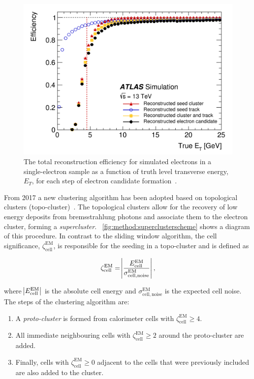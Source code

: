 \begin{figure}[]
    \centering
    \includegraphics[width=\mediumfigwidth]{images/2015_2016_recoeff.png}
    \caption[Total reconstruction energy for simulated electrons using the sliding window algorithm]{The total reconstruction efficiency for simulated electrons in a single-electron sample as a function of truth level transverse energy, $E_T$, for each step of electron candidate formation~\cite{slidingwindowreco}.}
    \label{fig:method:slidingwindow-reco}
\end{figure}

From 2017 a new clustering algorithm has been adopted based on topological clusters (topo-cluster)~\cite{Aad:2019tso}. The topological clusters allow for the recovery of low energy deposits from bremsstrahlung photons and associate them to the electron cluster, forming a \emph{supercluster}. ~\cref{fig:method:superclusterscheme} shows a diagram of this procedure. In contrast to the sliding window algorithm, the cell significance, $\zeta^{\mathrm{EM}}_{\mathrm{cell}}$, is responsible for the seeding in a topo-cluster and is defined as

\begin{equation}
    \zeta^{\mathrm{EM}}_{\mathrm{cell}} = \abs{\frac{E^{\mathrm{EM}}_{\mathrm{cell}}}{\sigma^{\mathrm{EM}}_{\mathrm{cell,noise}}}},
\end{equation}

where $\abs{E^{\mathrm{EM}}_{\mathrm{cell}}}$ is the absolute cell energy and $\sigma^{\mathrm{EM}}_{\mathrm{cell,noise}}$ is the expected cell noise. The steps of the clustering algorithm are: 
\begin{enumerate}
    \item A \emph{proto-cluster} is formed from calorimeter cells with $\zeta^{\mathrm{EM}}_{\mathrm{cell}} \geq 4$. 
    \item All immediate neighbouring cells with $\zeta^{\mathrm{EM}}_{\mathrm{cell}} \geq 2$ around the proto-cluster are added.
    \item Finally, cells with $\zeta^{\mathrm{EM}}_{\mathrm{cell}} \geq 0$ adjacent to the cells that were previously included are also added to the cluster.
\end{enumerate}

